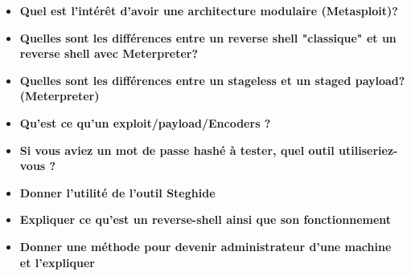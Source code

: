 \begin{itemize}
    \item \textbf{Quel est l'intérêt d'avoir une architecture modulaire (Metasploit)?}
    \item \textbf{Quelles sont les différences entre un reverse shell "classique" et un reverse shell avec Meterpreter?}
    \item \textbf{Quelles sont les différences entre un stageless et un staged payload? (Meterpreter)}
    \item \textbf{Qu'est ce qu'un exploit/payload/Encoders ?}
    \item \textbf{Si vous aviez un mot de passe hashé à tester, quel outil utiliseriez-vous ?}
    \item \textbf{Donner l'utilité de l'outil Steghide}
    \item \textbf{Expliquer ce qu'est un reverse-shell ainsi que son fonctionnement}
    \item \textbf{Donner une méthode pour devenir administrateur d'une machine et l'expliquer}
\end{itemize}
